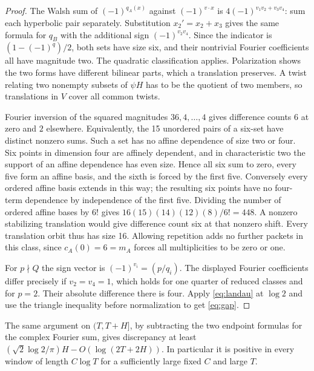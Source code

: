 \documentclass[11pt,letterpaper]{article}
\begin{document}
\begin{proof}
The Walsh sum of $(-1)^{q_A(x)}$ against $(-1)^{v\cdot x}$ is $4(-1)^{v_1v_2+v_3v_4}$: sum each hyperbolic pair separately. Substitution $x_2'=x_2+x_3$ gives the same formula for $q_B$ with the additional sign $(-1)^{v_2v_4}$. Since the indicator is $(1-(-1)^q)/2$, both sets have size six, and their nontrivial Fourier coefficients all have magnitude two. The quadratic classification applies. Polarization shows the two forms have different bilinear parts, which a translation preserves. A twist relating two nonempty subsets of $\psi H$ has to be the quotient of two members, so translations in $V$ cover all common twists.

Fourier inversion of the squared magnitudes $36,4,\ldots,4$ gives difference counts $6$ at zero and $2$ elsewhere. Equivalently, the 15 unordered pairs of a six-set have distinct nonzero sums. Such a set has no affine dependence of size two or four. Six points in dimension four are affinely dependent, and in characteristic two the support of an affine dependence has even size. Hence all six sum to zero, every five form an affine basis, and the sixth is forced by the first five. Conversely every ordered affine basis extends in this way; the resulting six points have no four-term dependence by independence of the first five. Dividing the number of ordered affine bases by $6!$ gives
$16(15)(14)(12)(8)/6!=448$. A nonzero stabilizing translation would give difference count six at that nonzero shift. Every translation orbit thus has size 16. Allowing repetition adds no further packets in this class, since $c_A(0)=6=m_A$ forces all multiplicities to be zero or one.

For $p\nmid Q$ the sign vector is $(-1)^{v_i}=(p/q_i)$. The displayed Fourier coefficients differ precisely if $v_2=v_4=1$, which holds for one quarter of reduced classes and for $p=2$. Their absolute difference there is four. Apply \eqref{eq:landau} at $\log 2$ and use the triangle inequality before normalization to get \eqref{eq:gap}.
\end{proof}
The same argument on $(T,T+H]$, by subtracting the two endpoint formulas for the complex Fourier sum, gives discrepancy at least $(\sqrt2\log2/\pi)H-O(\log(2T+2H))$. In particular it is positive in every window of length $C\log T$ for a sufficiently large fixed $C$ and large $T$.

\newpage
\end{document}
